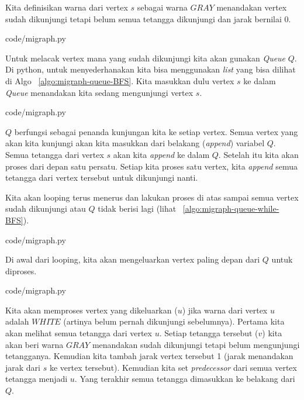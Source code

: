 Kita definisikan warna dari vertex $s$ sebagai warna $GRAY$ menandakan vertex sudah dikunjungi tetapi belum semua tetangga dikunjungi dan jarak bernilai 0.


                {code/migraph.py}

Untuk melacak vertex mana yang sudah dikunjungi kita akan gunakan \textit{Queue} $Q$. Di python, untuk menyederhanakan kita bisa menggunakan \textit{list} yang bisa dilihat di Algo ~\ref{algo:migraph-queue-BFS}. Kita masukkan dulu vertex $s$ ke dalam \textit{Queue} menandakan kita sedang mengunjungi vertex $s$.


                {code/migraph.py}

$Q$ berfungsi sebagai penanda kunjungan kita ke setiap vertex. Semua vertex yang akan kita kunjungi akan kita masukkan dari belakang (\textit{append}) variabel $Q$. Semua tetangga dari vertex $s$ akan kita \textit{append} ke dalam $Q$. Setelah itu kita akan proses dari depan satu persatu. Setiap kita proses satu vertex, kita \textit{append} semua tetangga dari vertex tersebut untuk dikunjungi nanti.

Kita akan looping terus menerus dan lakukan proses di atas sampai semua vertex sudah dikunjungi atau $Q$ tidak berisi lagi (lihat ~\ref{algo:migraph-queue-while-BFS}).


                {code/migraph.py}
								
Di awal dari looping, kita akan mengeluarkan vertex paling depan dari $Q$ untuk diproses. 


                {code/migraph.py}

Kita akan memproses vertex yang dikeluarkan ($u$) jika warna dari vertex $u$ adalah $WHITE$ (artinya belum pernah dikunjungi sebelumnya). Pertama kita akan melihat semua tetangga dari vertex $u$. Setiap tetangga tersebut ($v$) kita akan beri warna $GRAY$ menandakan sudah dikunjungi tetapi belum mengunjungi tetangganya. Kemudian kita tambah jarak vertex tersebut 1 (jarak menandakan jarak dari $s$ ke vertex tersebut). Kemudian kita set \textit{predecessor} dari semua vertex tetangga menjadi $u$. Yang terakhir semua tetangga dimasukkan ke belakang dari $Q$.

